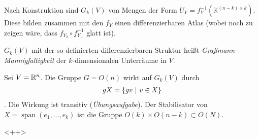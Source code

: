 \documentclass{skript}
\begin{document}
Nach Konstruktion sind $G_k(V)$ von Mengen der Form $U_Y =
f_Y^{-1}(\mathbb{K}^{(n-k)\times k})$. Diese bilden zusammen mit den $f_Y$
einen differenzierbaren Atlas (wobei noch zu zeigen wäre, dass $f_{Y_2}\circ
f_{Y_1}^{-1}$ glatt ist).

$G_k(V)$ mit der so definierten differenzierbaren Struktur heißt
\emph{Graßmann-Mannigfaltigkeit} der $k$-dimensionalen Unterräume in $V$.

\begin{bem}
  Sei $V=\mathbb{R}^n$. Die Gruppe $G = O(n)$ wirkt auf $G_k(V)$ durch
  \begin{align*}
    gX = \mdef[gv]{v\in X}
  \end{align*}.
  Die Wirkung ist transitiv (\emph{Übungsaufgabe}). Der Stabilisator von
  $X=\operatorname{span}(e_1,\ldots,e_k)$ ist die Gruppe $O(k)\times O(n-k)
  \subset O(N)$.
\end{bem}<++>
\end{document}
